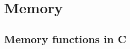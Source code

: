 \documentclass[a4paper,11pt,twoside]{book}
\begin{document}
\begin{itemize}
	
%		
%		
%		
%
	
\end{itemize}


\chapter{Memory}

\section{Memory functions in C}
\end{document}
